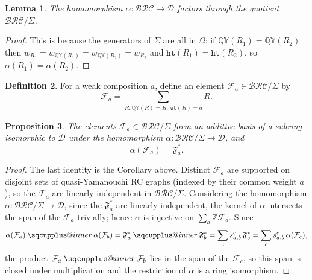 \documentclass{amsart}
\makeatletter
\newcommand{\sqcupplus@inner}[2]{%
  \vcenter{\hbox{\ooalign{%
    \hfil$\m@th#1\sqcup$\hfil\cr
    \hfil\raisebox{0.15ex}{$\m@th#1\scriptscriptstyle+$}\hfil\cr
  }}}%
}
\newcommand{\sqcupplus}{\mathbin{\mathpalette\sqcupplus@inner\relax}}
\newtheorem{lemma}{Lemma}[subsection]
\newtheorem{proposition}[lemma]{Proposition}
\theoremstyle{definition}
\newtheorem{definition}[lemma]{Definition}
\theoremstyle{remark}
\numberwithin{equation}{subsection}
\newcommand{\wof}[1]{w_{#1}}
\newcommand{\wtt}{\mathtt{wt}}
\newcommand{\QY}{\ensuremath{\mathbb{QY}}}
\newcommand{\hr}{\mathtt{ht}}
\newcommand{\BRC}{\mathcal{BRC}}
\newcommand{\dcoma}{\mathcal{D}}
\makeatother
\begin{document}
\begin{lemma}
The homomorphism $\alpha:\BRC\to\dcoma$ factors through the quotient $\BRC/\Sigma$.
\end{lemma}
\begin{proof}
This is because the generators of $\Sigma$ are all in $\Omega$: if $\QY(R_1)=\QY(R_2)$ then $\wof{R_1}=\wof{\QY(R_1)}=\wof{\QY(R_2)}=\wof{R_2}$ and $\hr(R_1)=\hr(R_2)$, so $\alpha(R_1)=\alpha(R_2)$.
\end{proof}

\begin{definition}
For a weak composition $a$, define an element $\mathcal{F}_a\in\BRC/\Sigma$ by
$$\mathcal{F}_a=\sum_{R: \QY(R)=R,\ \wtt(R)=a} R.$$
\end{definition}

\begin{proposition}\label{proposition:slidebasis}
The elements $\mathcal{F}_a\in\BRC/\Sigma$ form an additive basis of a subring isomorphic to $\dcoma$ under the homomorphism $\alpha:\BRC/\Sigma\to\dcoma$, and
$$\alpha(\mathcal{F}_a)=\mathfrak{F}_a^*.$$
\end{proposition}
\begin{proof}
The last identity is the Corollary above. Distinct $\mathcal{F}_a$ are supported on disjoint sets of quasi-Yamanouchi RC graphs (indexed by their common weight $a$), so the $\mathcal{F}_a$ are linearly independent in $\BRC/\Sigma$. Considering the homomorphism $\alpha:\BRC/\Sigma\to\dcoma$, since the $\mathfrak{F}_a^*$ are linearly independent, the kernel of $\alpha$ intersects the span of the $\mathcal{F}_a$ trivially; hence $\alpha$ is injective on $\sum_a \mathbb{Z}\mathcal{F}_a$. Since
$$\alpha(\mathcal{F}_a)\sqcupplus\alpha(\mathcal{F}_b)=\mathfrak{F}_a^*\sqcupplus\mathfrak{F}_b^*=\sum_c s_{a,b}^c\,\mathfrak{F}_c^*=\sum_c s_{a,b}^c\,\alpha(\mathcal{F}_c),$$
the product $\mathcal{F}_a\sqcupplus\mathcal{F}_b$ lies in the span of the $\mathcal{F}_c$, so this span is closed under multiplication and the restriction of $\alpha$ is a ring isomorphism.
\end{proof}
\end{document}
